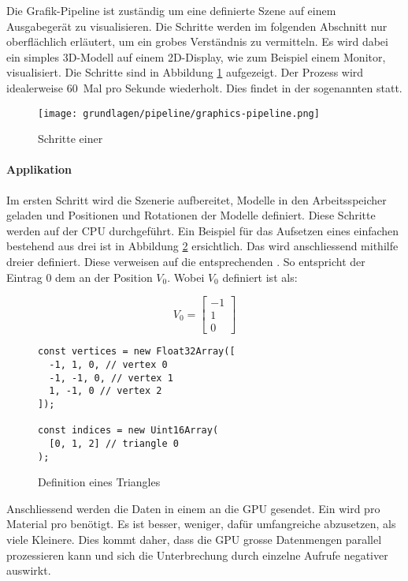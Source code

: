 Die Grafik-Pipeline ist zuständig um eine definierte Szene auf einem Ausgabegerät zu visualisieren. Die Schritte werden im folgenden Abschnitt nur oberflächlich erläutert, um ein grobes Verständnis zu vermitteln. Es wird dabei ein simples 3D-Modell auf einem 2D-Display, wie zum Beispiel einem Monitor, visualisiert. Die Schritte sind in Abbildung \ref{fig:renderingPipelineOverview} aufgezeigt. Der Prozess wird idealerweise 60 Mal pro Sekunde wiederholt. Dies findet in der sogenannten  statt.

\begin{figure}[H]
  \centering
  \texttt{[image: grundlagen/pipeline/graphics-pipeline.png]}
  \caption{Schritte einer }
  \label{fig:renderingPipelineOverview}
\end{figure}

\paragraph{Applikation}
Im ersten Schritt wird die Szenerie aufbereitet, Modelle in den Arbeitsspeicher geladen und Positionen und Rotationen der Modelle definiert. Diese Schritte werden auf der \gls{CPU} durchgeführt. Ein Beispiel für das Aufsetzen eines einfachen  bestehend aus drei  ist in Abbildung \ref{fig:geometryDefinition} ersichtlich. Das  wird anschliessend mithilfe dreier  definiert. Diese  verweisen auf die entsprechenden . So entspricht der Eintrag $0$ dem  an der Position $V_0$. Wobei $V_0$ definiert ist als:

$$
V_0 = \begin{bmatrix}
  -1 \\
  1 \\
  0
\end{bmatrix}
$$

\begin{figure}[H]
\begin{lstlisting}[style=JavaScript]
const vertices = new Float32Array([
  -1, 1, 0, // vertex 0
  -1, -1, 0, // vertex 1
  1, -1, 0 // vertex 2
]);

const indices = new Uint16Array(
  [0, 1, 2] // triangle 0
);
\end{lstlisting}
\caption{Definition eines Triangles}
\label{fig:geometryDefinition}
\end{figure}

Anschliessend werden die Daten in einem  an die \gls{GPU} gesendet. Ein  wird pro Material pro  benötigt. Es ist besser, weniger, dafür umfangreiche  abzusetzen, als viele Kleinere. Dies kommt daher, dass die \gls{GPU} grosse Datenmengen parallel prozessieren kann und sich die Unterbrechung durch einzelne Aufrufe negativer auswirkt.

